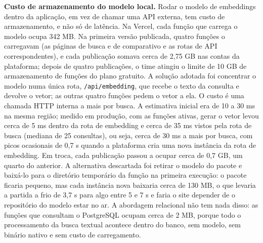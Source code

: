 \documentclass[12pt,oneside,a4paper,english,brazil]{abntex2}
\newcommand{\campo}[1]{\texttt{#1}}
\begin{document}
\textbf{Custo de armazenamento do modelo local.} Rodar o modelo de embeddings dentro da aplicação, em vez de chamar uma API externa, tem custo de armazenamento, e não só de latência. Na Vercel, cada função que carrega o modelo ocupa 342 MB. Na primeira versão publicada, quatro funções o carregavam (as páginas de busca e de comparativo e as rotas de API correspondentes), e cada publicação somava cerca de 2,75 GB nas contas da plataforma; depois de quatro publicações, o time atingiu o limite de 10 GB de armazenamento de funções do plano gratuito. A solução adotada foi concentrar o modelo numa única rota, \campo{/api/embedding}, que recebe o texto da consulta e devolve o vetor; as outras quatro funções pedem o vetor a ela. O custo é uma chamada HTTP interna a mais por busca. A estimativa inicial era de 10 a 30 ms na mesma região; medido em produção, com as funções ativas, gerar o vetor levou cerca de 5 ms dentro da rota de embedding e cerca de 35 ms vistos pela rota de busca (mediana de 25 consultas), ou seja, cerca de 30 ms a mais por busca, com picos ocasionais de 0,7 s quando a plataforma cria uma nova instância da rota de embedding. Em troca, cada publicação passou a ocupar cerca de 0,7 GB, um quarto do anterior. A alternativa descartada foi retirar o modelo do pacote e baixá-lo para o diretório temporário da função na primeira execução: o pacote ficaria pequeno, mas cada instância nova baixaria cerca de 130 MB, o que levaria a partida a frio de 3,7 s para algo entre 5 e 7 s e faria o site depender de o repositório do modelo estar no ar. A abordagem relacional não tem nada disso: as funções que consultam o PostgreSQL ocupam cerca de 2 MB, porque todo o processamento da busca textual acontece dentro do banco, sem modelo, sem binário nativo e sem custo de carregamento.
\end{document}
